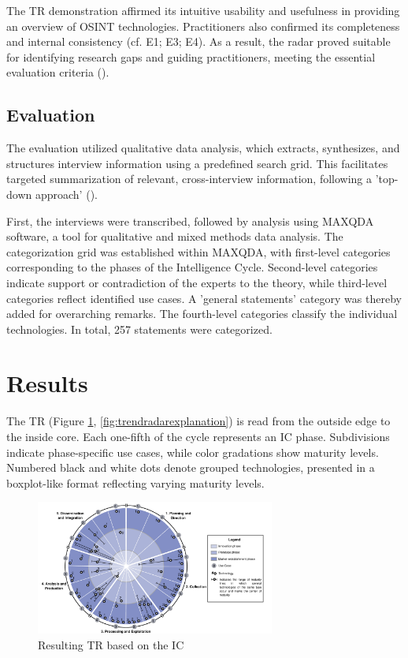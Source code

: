 \documentclass[10pt]{article}
\begin{document}
The TR demonstration affirmed its intuitive usability and usefulness in providing an overview of OSINT technologies. Practitioners also confirmed its completeness and internal consistency (cf. E1; E3; E4). As a result, the radar proved suitable for identifying research gaps and guiding practitioners, meeting the essential evaluation criteria (\cite{Sonnenberg.2012}).

\subsection{Evaluation} \label{sec:eval}

The evaluation utilized qualitative data analysis, which extracts, synthesizes, and structures interview information using a predefined search grid. This facilitates targeted summarization of relevant, cross-interview information, following a 'top-down approach' (\cite{Bogner.2014}).

First, the interviews were transcribed, followed by analysis using MAXQDA software, a tool for qualitative and mixed methods data analysis. The categorization grid was established within MAXQDA, with first-level categories corresponding to the phases of the Intelligence Cycle. Second-level categories indicate support or contradiction of the experts to the theory, while third-level categories reflect identified use cases. A 'general statements' category was thereby added for overarching remarks. The fourth-level categories classify the individual technologies. In total, 257 statements were categorized.

\section{Results} \label{sec:results}

The TR (Figure \ref{fig:trendradar}, \ref{fig:trendradarexplanation}) is read from the outside edge to the inside core.
Each one-fifth of the cycle represents an IC phase. Subdivisions indicate
phase-specific use cases, while color gradations show maturity levels. Numbered black
and white dots denote grouped technologies, presented in a boxplot-like format reflecting
varying maturity levels.

\begin{figure}[thb]
    \centering
    \includegraphics[width=0.7\textwidth]{PDF/images/crop_Trendradar}
    \caption{Resulting TR based on the IC}
    \label{fig:trendradar}
\end{figure}
\end{document}
